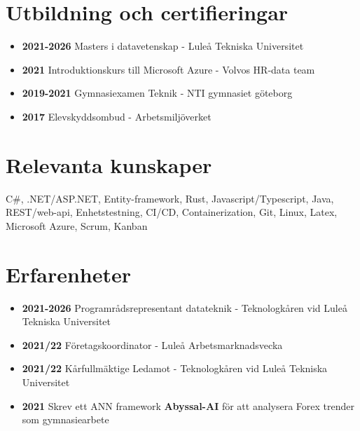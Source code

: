 \documentclass[a4paper]{article}
\begin{document}
\section{Utbildning och certifieringar}
    \begin{itemize}
        \item{
            \textbf{2021-2026} Masters i datavetenskap - Luleå Tekniska Universitet 
        }

        \item{
            \textbf{2021} Introduktionskurs till Microsoft Azure - Volvos HR-data team 
        }

        \item{
            \textbf{2019-2021} Gymnasiexamen Teknik - NTI gymnasiet göteborg
        }

        \item{ %
            \textbf{2017} Elevskyddsombud - Arbetsmiljöverket
        }
    \end{itemize}

\section{Relevanta kunskaper}
    C\#, .NET/ASP.NET, Entity-framework, Rust, Javascript/Typescript, Java, REST/web-api,
    Enhetstestning, CI/CD, Containerization, Git, Linux, Latex, Microsoft Azure, Scrum,
    Kanban

\section{Erfarenheter}

    \begin{itemize}
        \item {\textbf{2021-2026} Programrådsrepresentant datateknik - Teknologkåren vid Luleå Tekniska Universitet}
        \item {\textbf{2021/22} Företagskoordinator - Luleå Arbetsmarknadsvecka}
        \item {\textbf{2021/22} Kårfullmäktige Ledamot - Teknologkåren vid Luleå Tekniska Universitet}
        \item {\textbf{2021} Skrev ett ANN framework \textbf{Abyssal-AI} för att analysera Forex trender som gymnasiearbete}
        
    \end{itemize}
\end{document}

